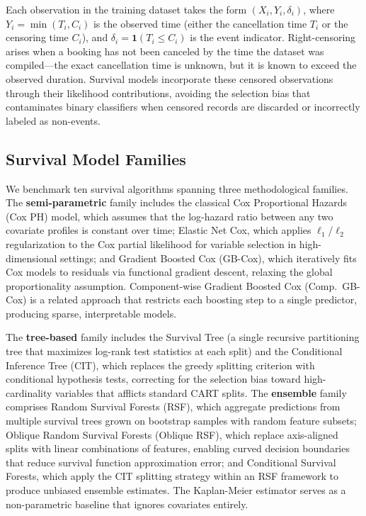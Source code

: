 \documentclass[pdflatex,sn-mathphys-ay]{sn-jnl}
\theoremstyle{thmstyleone}%
\theoremstyle{thmstyletwo}%
\theoremstyle{thmstylethree}%
\begin{document}
Each observation in the training dataset takes the form $(X_i, Y_i, \delta_i)$, where $Y_i = \min(T_i, C_i)$ is the observed time (either the cancellation time $T_i$ or the censoring time $C_i$), and $\delta_i = \mathbf{1}(T_i \leq C_i)$ is the event indicator. Right-censoring arises when a booking has not been canceled by the time the dataset was compiled—the exact cancellation time is unknown, but it is known to exceed the observed duration. Survival models incorporate these censored observations through their likelihood contributions, avoiding the selection bias that contaminates binary classifiers when censored records are discarded or incorrectly labeled as non-events.

\subsection{Survival Model Families}

We benchmark ten survival algorithms spanning three methodological families. The \textbf{semi-parametric} family includes the classical Cox Proportional Hazards (Cox PH) model, which assumes that the log-hazard ratio between any two covariate profiles is constant over time; Elastic Net Cox, which applies $\ell_1$/$\ell_2$ regularization to the Cox partial likelihood for variable selection in high-dimensional settings; and Gradient Boosted Cox (GB-Cox), which iteratively fits Cox models to residuals via functional gradient descent, relaxing the global proportionality assumption. Component-wise Gradient Boosted Cox (Comp.\ GB-Cox) is a related approach that restricts each boosting step to a single predictor, producing sparse, interpretable models.

The \textbf{tree-based} family includes the Survival Tree (a single recursive partitioning tree that maximizes log-rank test statistics at each split) and the Conditional Inference Tree (CIT), which replaces the greedy splitting criterion with conditional hypothesis tests, correcting for the selection bias toward high-cardinality variables that afflicts standard CART splits. The \textbf{ensemble} family comprises Random Survival Forests (RSF), which aggregate predictions from multiple survival trees grown on bootstrap samples with random feature subsets; Oblique Random Survival Forests (Oblique RSF), which replace axis-aligned splits with linear combinations of features, enabling curved decision boundaries that reduce survival function approximation error; and Conditional Survival Forests, which apply the CIT splitting strategy within an RSF framework to produce unbiased ensemble estimates. The Kaplan-Meier estimator serves as a non-parametric baseline that ignores covariates entirely.
\end{document}
